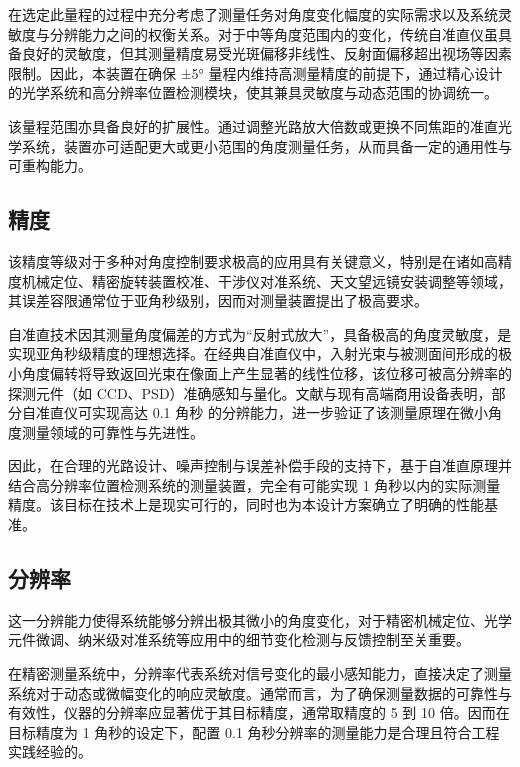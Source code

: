 在选定此量程的过程中充分考虑了测量任务对角度变化幅度的实际需求以及系统灵敏度与分辨能力之间的权衡关系。对于中等角度范围内的变化，传统自准直仪虽具备良好的灵敏度，但其测量精度易受光斑偏移非线性、反射面偏移超出视场等因素限制。因此，本装置在确保 ±5° 量程内维持高测量精度的前提下，通过精心设计的光学系统和高分辨率位置检测模块，使其兼具灵敏度与动态范围的协调统一。

该量程范围亦具备良好的扩展性。通过调整光路放大倍数或更换不同焦距的准直光学系统，装置亦可适配更大或更小范围的角度测量任务，从而具备一定的通用性与可重构能力。

\subsection{精度}


该精度等级对于多种对角度控制要求极高的应用具有关键意义，特别是在诸如高精度机械定位、精密旋转装置校准、干涉仪对准系统、天文望远镜安装调整等领域，其误差容限通常位于亚角秒级别，因而对测量装置提出了极高要求。

自准直技术因其测量角度偏差的方式为“反射式放大”，具备极高的角度灵敏度，是实现亚角秒级精度的理想选择。在经典自准直仪中，入射光束与被测面间形成的极小角度偏转将导致返回光束在像面上产生显著的线性位移，该位移可被高分辨率的探测元件（如 CCD、PSD）准确感知与量化。文献与现有高端商用设备表明，部分自准直仪可实现高达 0.1 角秒 的分辨能力，进一步验证了该测量原理在微小角度测量领域的可靠性与先进性。

因此，在合理的光路设计、噪声控制与误差补偿手段的支持下，基于自准直原理并结合高分辨率位置检测系统的测量装置，完全有可能实现 1 角秒以内的实际测量精度。该目标在技术上是现实可行的，同时也为本设计方案确立了明确的性能基准。

\subsection{分辨率}


这一分辨能力使得系统能够分辨出极其微小的角度变化，对于精密机械定位、光学元件微调、纳米级对准系统等应用中的细节变化检测与反馈控制至关重要。

在精密测量系统中，分辨率代表系统对信号变化的最小感知能力，直接决定了测量系统对于动态或微幅变化的响应灵敏度。通常而言，为了确保测量数据的可靠性与有效性，仪器的分辨率应显著优于其目标精度，通常取精度的 5 到 10 倍。因而在目标精度为 1 角秒的设定下，配置 0.1 角秒分辨率的测量能力是合理且符合工程实践经验的。

